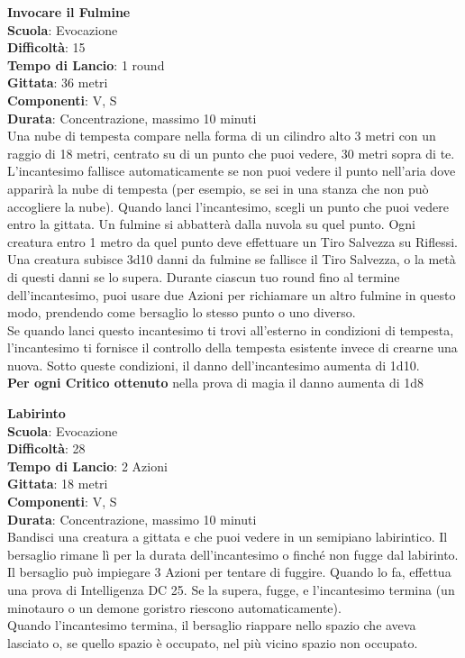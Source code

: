 \begin{multicols}{2}
\medskip\textbf{Invocare il Fulmine}\\
\textbf{Scuola}: Evocazione\\
\textbf{Difficoltà}: 15\\
\textbf{Tempo di Lancio}: 1 round\\
\textbf{Gittata}: 36 metri\\
\textbf{Componenti}: V, S\\
\textbf{Durata}: Concentrazione, massimo 10 minuti\\
Una nube di tempesta compare nella forma di un cilindro alto 3 metri con un raggio di 18 metri, centrato su di un punto che puoi vedere, 30 metri sopra di te. L'incantesimo fallisce automaticamente se non puoi vedere il punto nell'aria dove apparirà la nube di tempesta (per esempio, se sei in una stanza che non può accogliere la nube). Quando lanci l'incantesimo, scegli un punto che puoi vedere entro la gittata. Un fulmine si abbatterà dalla nuvola su quel punto. Ogni creatura entro 1 metro da quel punto deve effettuare un Tiro Salvezza su Riflessi. Una creatura subisce 3d10 danni da fulmine se fallisce il Tiro Salvezza, o la metà di questi danni se lo supera. Durante ciascun tuo round fino al termine dell'incantesimo, puoi usare due Azioni per richiamare un altro fulmine in questo modo, prendendo come bersaglio lo stesso punto o uno diverso.\\
Se quando lanci questo incantesimo ti trovi all'esterno in condizioni di tempesta, l'incantesimo ti fornisce il controllo della tempesta esistente invece di crearne una nuova. Sotto queste condizioni, il danno dell'incantesimo aumenta di 1d10. \\
\textbf{Per ogni Critico ottenuto} nella prova di magia il danno aumenta di 1d8

\medskip\textbf{Labirinto}\\
\textbf{Scuola}: Evocazione\\
\textbf{Difficoltà}: 28\\
\textbf{Tempo di Lancio}: 2 Azioni\\
\textbf{Gittata}: 18 metri\\
\textbf{Componenti}: V, S\\
\textbf{Durata}: Concentrazione, massimo 10 minuti\\
Bandisci una creatura a gittata e che puoi vedere in un semipiano labirintico. Il bersaglio rimane lì per la durata dell'incantesimo o finché non fugge dal labirinto. Il bersaglio può impiegare 3 Azioni per tentare di fuggire. Quando lo fa, effettua una prova di Intelligenza DC 25. Se la supera, fugge, e l'incantesimo termina (un minotauro o un demone goristro riescono automaticamente).\\
Quando l'incantesimo termina, il bersaglio riappare nello spazio che aveva lasciato o, se quello spazio è occupato, nel più vicino spazio non occupato. 


\end{multicols}
